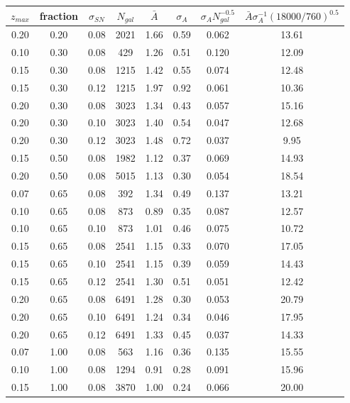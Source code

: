 \documentclass{aastex62}   	%
\begin{document}
\begin{table}
   \centering
   \begin{tabular}{|ccc|ccccc|} %
   \hline
$z_{max}$ & fraction & $\sigma_{SN}$ & $N_{gal}$ & $\bar{A}$ & $\sigma_A$ & $\sigma_A N_{gal}^{-0.5}$ & $\bar{A} \sigma_A^{-1} (18000/760)^{0.5}$ \\
\hline
0.20 & 0.20 & 0.08 & 2021 &   1.66 &   0.59 &  0.062 &  13.61 \\
0.10 & 0.30 & 0.08 & 429 &   1.26 &   0.51 &  0.120 &  12.09 \\
0.15 & 0.30 & 0.08 & 1215 &   1.42 &   0.55 &  0.074 &  12.48 \\
0.15 & 0.30 & 0.12 & 1215 &   1.97 &   0.92 &  0.061 &  10.36 \\
0.20 & 0.30 & 0.08 & 3023 &   1.34 &   0.43 &  0.057 &  15.16 \\
0.20 & 0.30 & 0.10 & 3023 &   1.40 &   0.54 &  0.047 &  12.68 \\
0.20 & 0.30 & 0.12 & 3023 &   1.48 &   0.72 &  0.037 &   9.95 \\
0.15 & 0.50 & 0.08 & 1982 &   1.12 &   0.37 &  0.069 &  14.93 \\
0.20 & 0.50 & 0.08 & 5015 &   1.13 &   0.30 &  0.054 &  18.54 \\
0.07 & 0.65 & 0.08 & 392 &   1.34 &   0.49 &  0.137 &  13.21 \\
0.10 & 0.65 & 0.08 & 873 &   0.89 &   0.35 &  0.087 &  12.57 \\
0.10 & 0.65 & 0.10 & 873 &   1.01 &   0.46 &  0.075 &  10.72 \\
0.15 & 0.65 & 0.08 & 2541 &   1.15 &   0.33 &  0.070 &  17.05 \\
0.15 & 0.65 & 0.10 & 2541 &   1.15 &   0.39 &  0.059 &  14.43 \\
0.15 & 0.65 & 0.12 & 2541 &   1.30 &   0.51 &  0.051 &  12.42 \\
0.20 & 0.65 & 0.08 & 6491 &   1.28 &   0.30 &  0.053 &  20.79 \\
0.20 & 0.65 & 0.10 & 6491 &   1.24 &   0.34 &  0.046 &  17.95 \\
0.20 & 0.65 & 0.12 & 6491 &   1.33 &   0.45 &  0.037 &  14.33 \\
0.07 & 1.00 & 0.08 & 563 &   1.16 &   0.36 &  0.135 &  15.55 \\
0.10 & 1.00 & 0.08 & 1294 &   0.91 &   0.28 &  0.091 &  15.96 \\
0.15 & 1.00 & 0.08 & 3870 &   1.00 &   0.24 &  0.066 &  20.00 \\

\end{tabular}
\end{table}
\end{document}
